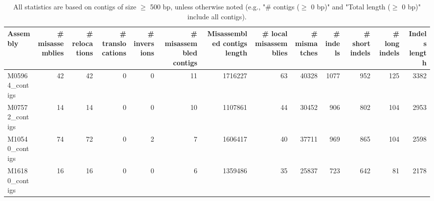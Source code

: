 \documentclass[12pt,a4paper]{article}
\begin{document}
\begin{table}[ht]
\begin{center}
\caption{All statistics are based on contigs of size $\geq$ 500 bp, unless otherwise noted (e.g., "\# contigs ($\geq$ 0 bp)" and "Total length ($\geq$ 0 bp)" include all contigs).}
\begin{tabular}{|l*{12}{|r}|}
\hline
Assembly & \# misassemblies &     \# relocations &     \# translocations &     \# inversions & \# misassembled contigs & Misassembled contigs length & \# local misassemblies & \# mismatches & \# indels &     \# short indels &     \# long indels & Indels length \\ \hline
M05964\_contigs & 42 & 42 & 0 & 0 & 11 & 1716227 & 63 & 40328 & 1077 & 952 & 125 & 3382 \\ \hline
M07572\_contigs & 14 & 14 & 0 & 0 & 10 & 1107861 & 44 & 30452 & 906 & 802 & 104 & 2953 \\ \hline
M10540\_contigs & 74 & 72 & 0 & 2 & 7 & 1606417 & 40 & 37711 & 969 & 865 & 104 & 2598 \\ \hline
M16180\_contigs & 16 & 16 & 0 & 0 & 6 & 1359486 & 35 & 25837 & 723 & 642 & 81 & 2178 \\ \hline
\end{tabular}
\end{center}
\end{table}
\end{document}
